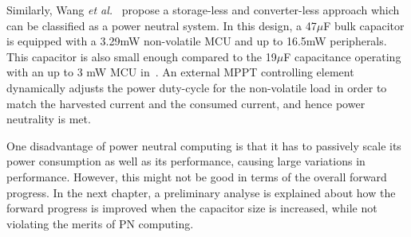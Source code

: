 Similarly, Wang \textit{et al.}~\cite{wang2016storage} propose a storage-less and converter-less approach which can be classified as a power neutral system. In this design, a 47$\mu$F bulk capacitor is equipped with a 3.29mW non-volatile MCU and up to 16.5mW peripherals. This capacitor is also small enough compared to the 19$\mu$F capacitance operating with an up to 3 mW MCU in~\cite{balsamo2016graceful}. An external MPPT controlling element dynamically adjusts the power duty-cycle for the non-volatile load in order to match the harvested current and the consumed current, and hence power neutrality is met. 

One disadvantage of power neutral computing is that it has to passively scale its power consumption as well as its performance, causing large variations in performance. However, this might not be good in terms of the overall forward progress. In the next chapter, a preliminary analyse is explained about how the forward progress is improved when the capacitor size is increased, while not violating the merits of PN computing. 